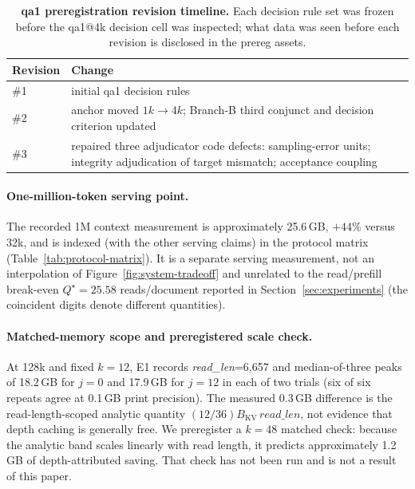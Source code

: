 \begin{table}[htbp]
\centering
\small
\setlength{\tabcolsep}{4pt}
\begin{tabular}{@{}p{}p{}@{}}
\toprule
\textbf{Revision} & \textbf{Change} \\
\midrule
\#1 & initial qa1 \mbox{decision} rules \\
\#2 & anchor moved $1k\!\to\!4k$; Branch-B third conjunct and \mbox{decision} criterion updated \\
\#3 & repaired three adjudicator code defects: sampling-error units; integrity adjudication of target mismatch; acceptance coupling \\
\bottomrule
\end{tabular}
\caption{\textbf{qa1 preregistration revision timeline.}  Each \mbox{decision}
rule set was frozen before the qa1@4k \mbox{decision} cell was inspected; what
data was seen before each revision is disclosed in the prereg assets.}
\label{tab:prereg-revisions}
\end{table}

\FloatBarrier

\paragraph{One-million-token serving point.}
The recorded 1M context measurement is approximately 25.6\,GB, $+44\%$ versus
32k, and is indexed (with the other serving claims) in the protocol matrix
(Table~\ref{tab:protocol-matrix}).  It is a separate serving measurement, not
an interpolation of Figure~\ref{fig:system-tradeoff} and unrelated to the
read/prefill break-even $Q^{\star}{=}25.58$ reads/document reported in
Section~\ref{sec:experiments} (the coincident digits denote different
quantities).

\paragraph{Matched-memory scope and preregistered scale check.}
At 128k and fixed $k=12$, E1 records \textit{read\_len}=6,657 and
median-of-three peaks of 18.2\,GB for $j=0$ and 17.9\,GB for $j=12$ in each of
two trials (six of six repeats agree at 0.1\,GB print precision).  The measured
0.3\,GB difference is the read-length-scoped analytic quantity
$(12/36)B_{\mathrm{KV}}\,\textit{read\_len}$, not evidence that depth caching is
generally free.  We preregister a $k=48$ matched check: because the analytic
band scales linearly with read length, it predicts approximately 1.2\,GB of
depth-attributed saving.  That check has not been run and is not a result of
this paper.

